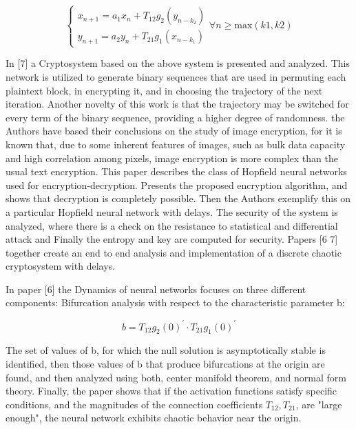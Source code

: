 \documentclass[12pt, letterpaper]{article}
\begin{document}
\begin{equation}\label{hopfield network}
    \begin{cases}
    x_{n+1} = a_{1}x_{n} + T_{12}g_{2}(y_{n - k_{2}})\\
    y_{n+1} = a_{2}y_{n} + T_{21}g_{1}(x_{n - k_{1}})
    \end{cases} \forall n \geq \text{max}(k1, k2)
\end{equation}


In [7] a Cryptosystem based on the above system is presented and analyzed. This network is utilized to generate binary sequences that are used in permuting each plaintext block, in encrypting it, and in choosing the trajectory of the next iteration. Another novelty of this work is that the trajectory may be switched for every term of the binary sequence, providing a higher degree of randomness. the Authors have based their conclusions on the study of image encryption, for it is known that, due to some inherent features of images, such as bulk data capacity and high correlation among pixels, image encryption is more complex than
the usual text encryption. This paper describes the class of Hopfield neural networks
used for encryption-decryption. Presents the proposed encryption algorithm, and shows
that decryption is completely possible. Then the Authors exemplify this on a particular Hopfield neural network with delays. The security of the system is analyzed, where there is a check on the resistance to statistical and differential attack and Finally the entropy and key are computed for
security. Papers [6 7] together create an end to end analysis and implementation of a discrete chaotic cryptosystem with delays.

In paper [6] the Dynamics of neural networks focuses on three different components: Bifurcation analysis with respect to the characteristic parameter b:

\begin{equation}\label{b defintion}
b = T_{12}g_{2}(0)^{'} \cdot T_{21}g_{1}(0)^{'}
\end{equation}

The set of values of b, for which the null solution is asymptotically stable is identified, then those values of b that produce bifurcations at the origin are found, and then analyzed using both, center manifold theorem, and normal form theory. Finally, the paper shows that if the activation functions satisfy specific conditions, and the magnitudes of the connection coefficients \(T_{12}, T_{21}\), are "large enough", the neural network exhibits chaotic behavior near the origin.
\end{document}
